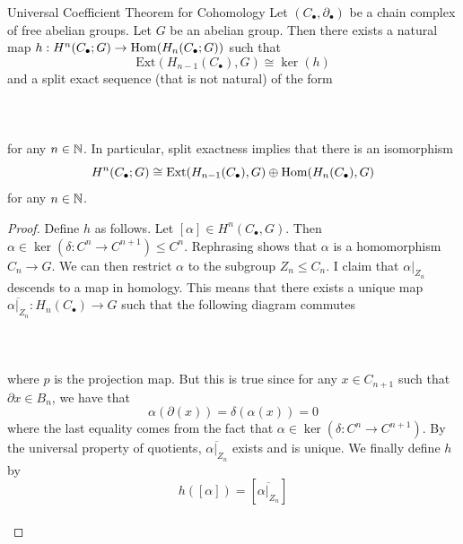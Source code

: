 \documentclass[a4paper]{article}
\begin{document}
\begin{thm}{Universal Coefficient Theorem for Cohomology}{} Let $(C_\bullet,\partial_\bullet)$ be a chain complex of free abelian groups. Let $G$ be an abelian group. Then there exists a natural map $h:H^n(C_\bullet;G)\to\operatorname{Hom}(H_n(C_\bullet;G))$ such that $$\text{Ext}(H_{n-1}(C_\bullet),G)\cong\ker(h)$$ and a split exact sequence (that is not natural) of the form \\~\\
\\~\\
for any $n\in\mathbb{N}$. In particular, split exactness implies that there is an isomorphism $$H^n(C_\bullet;G)\cong\text{Ext}(H_{n-1}(C_\bullet),G)\oplus\operatorname{Hom}(H_n(C_\bullet),G)$$ for any $n\in\mathbb{N}$. \tcbline
\begin{proof}
Define $h$ as follows. Let $[\alpha]\in H^n(C_\bullet,G)$. Then $\alpha\in\ker(\delta:C^n\to C^{n+1})\leq C^n$. Rephrasing shows that $\alpha$ is a homomorphism $C_n\to G$. We can then restrict $\alpha$ to the subgroup $Z_n\leq C_n$. I claim that $\alpha|_{Z_n}$ descends to a map in homology. This means that there exists a unique map $\overline{\alpha|_{Z_n}}:H_n(C_\bullet)\to G$ such that the following diagram commutes \\~\\
\\~\\
where $p$ is the projection map. But this is true since for any $x\in C_{n+1}$ such that $\partial x\in B_n$, we have that $$\alpha(\partial(x))=\delta(\alpha(x))=0$$ where the last equality comes from the fact that $\alpha\in\ker(\delta:C^n\to C^{n+1})$. By the universal property of quotients, $\overline{\alpha|_{Z_n}}$ exists and is unique. We finally define $h$ by $$h([\alpha])=\left[\overline{\alpha|_{Z_n}}\right]$$~\\


\end{proof}
\end{thm}
\end{document}
